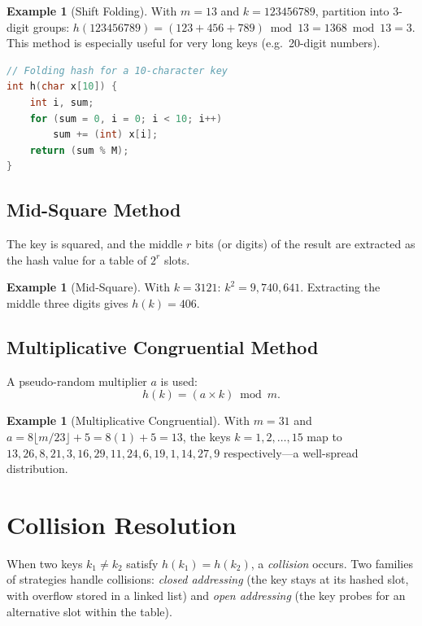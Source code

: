 \documentclass[11pt, a4paper, notitlepage]{report}
\theoremstyle{definition}
\theoremstyle{remark}
\theoremstyle{definition}
\newtheorem{example}[theorem]{Example}
\begin{document}
\begin{example}[Shift Folding]
\label{ex:hash-folding}
With $m = 13$ and $k = 123456789$, partition into 3-digit groups:
$h(123456789) = (123 + 456 + 789) \bmod 13 = 1368 \bmod 13 = 3$.
This method is especially useful for very long keys (e.g.\ 20-digit numbers).
\end{example}

\begin{lstlisting}[language=C]
// Folding hash for a 10-character key
int h(char x[10]) {
    int i, sum;
    for (sum = 0, i = 0; i < 10; i++)
        sum += (int) x[i];
    return (sum % M);
}
\end{lstlisting}

\subsection{Mid-Square Method}
\label{subsec:hash-midsquare}

The key is squared, and the middle $r$ bits (or digits) of the result are
extracted as the hash value for a table of $2^r$ slots.

\begin{example}[Mid-Square]
\label{ex:hash-midsquare}
With $k = 3121$: $k^2 = 9{,}740{,}641$.  Extracting the middle three digits
gives $h(k) = 406$.
\end{example}

\subsection{Multiplicative Congruential Method}
\label{subsec:hash-mcm}

A pseudo-random multiplier $a$ is used:
\[
  h(k) = (a \times k) \bmod m.
\]

\begin{example}[Multiplicative Congruential]
\label{ex:hash-mcm}
With $m = 31$ and $a = 8\lfloor m/23 \rfloor + 5 = 8(1) + 5 = 13$,
the keys $k = 1, 2, \ldots, 15$ map to
$13, 26, 8, 21, 3, 16, 29, 11, 24, 6, 19, 1, 14, 27, 9$ respectively---a
well-spread distribution.
\end{example}

\section{Collision Resolution}
\label{sec:collision-resolution}

When two keys $k_1 \neq k_2$ satisfy $h(k_1) = h(k_2)$, a \emph{collision}
occurs.  Two families of strategies handle collisions: \emph{closed
addressing} (the key stays at its hashed slot, with overflow stored in a
linked list) and \emph{open addressing} (the key probes for an alternative
slot within the table).
\end{document}
